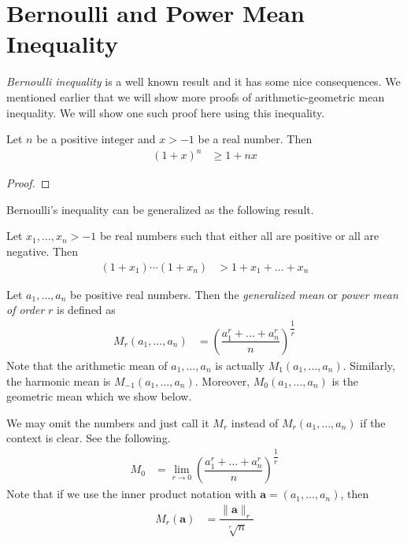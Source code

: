 \documentclass{subfile}
\begin{document}
	\section{Bernoulli and Power Mean Inequality}\label{sec:powermean}
	\textit{Bernoulli inequality} is a well known result and it has some nice consequences. We mentioned earlier that we will show more proofs of arithmetic-geometric mean inequality. We will show one such proof here using this inequality.
		\begin{theorem}
			Let $n$ be a positive integer and $x>-1$ be a real number. Then
				\begin{align*}
					(1+x)^n
						& \geq1+nx
				\end{align*}
		\end{theorem}
	
		\begin{proof}
			
		\end{proof}
	Bernoulli's inequality can be generalized as the following result.
		\begin{theorem}
			Let $x_1,\ldots,x_n>-1$ be real numbers such that either all are positive or all are negative. Then
				\begin{align*}
					(1+x_1)\cdots(1+x_n)
						& > 1+x_1+\ldots+x_n
				\end{align*}
		\end{theorem}%
	
		\begin{definition}
			Let $a_1,\ldots,a_n$ be positive real numbers. Then the \textit{generalized mean} or \textit{power mean of order} $r$ is defined as
				\begin{align*}
					M_r(a_1,\ldots,a_n)
						& = \left(\dfrac{a_1^r+\ldots+a_n^r}{n}\right)^{\dfrac{1}{r}}
				\end{align*}
			Note that the arithmetic mean of $a_1,\ldots,a_n$ is actually $M_1(a_1,\ldots,a_n)$. Similarly, the harmonic mean is $M_{-1}(a_1,\ldots,a_n)$. Moreover, $M_0(a_1,\ldots,a_n)$ is the geometric mean which we show below.
		\end{definition}
	We may omit the numbers and just call it $M_r$ instead of $M_r(a_1,\ldots,a_n)$ if the context is clear. See the following.
		\begin{align*}
			M_0
				& = \lim\limits_{r\to0}\left(\dfrac{a_1^r+\ldots+a_n^r}{n}\right)^{\dfrac{1}{r}}
		\end{align*}
	Note that if we use the inner product notation with $\mathbf{a}=(a_1,\ldots,a_n)$, then
		\begin{align*}
			M_r(\mathbf{a})
				& = \dfrac{\|\mathbf{a}\|_{r}}{\sqrt[r]{n}}
		\end{align*}
	
\end{document}
